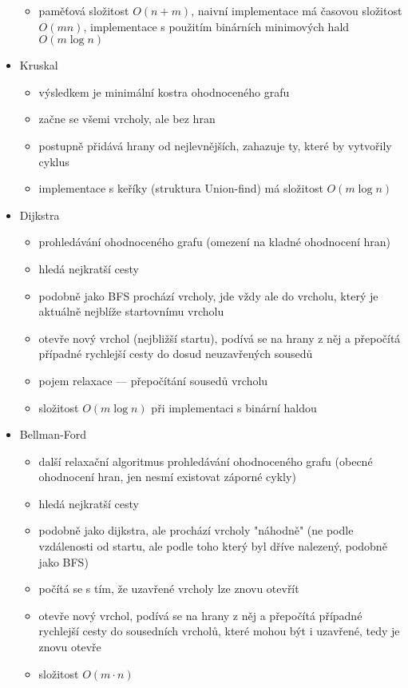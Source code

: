 \begin{itemize}
\begin{itemize}
		\item paměťová složitost $O(n + m)$, naivní implementace má časovou složitost $O(mn)$, implementace s použitím binárních minimových hald $O(m\log n)$
	\end{itemize}
	\item Kruskal
	\begin{itemize}
		\item výsledkem je minimální kostra ohodnoceného grafu
		\item začne se všemi vrcholy, ale bez hran
		\item postupně přidává hrany od nejlevnějších, zahazuje ty, které by vytvořily cyklus
		\item implementace s keříky (struktura Union-find) má složitost $O(m\log n)$
	\end{itemize}
	\item Dijkstra
	\begin{itemize}
		\item prohledávání ohodnoceného grafu (omezení na kladné ohodnocení hran)
		\item hledá nejkratší cesty
		\item podobně jako BFS prochází vrcholy, jde vždy ale do vrcholu, který je aktuálně nejblíže startovnímu vrcholu
		\item otevře nový vrchol (nejbližší startu), podívá se na hrany z něj a přepočítá případné rychlejší cesty do dosud neuzavřených sousedů
		\item pojem relaxace --- přepočítání sousedů vrcholu
		\item  složitost $O(m\log n)$ při implementaci s binární haldou
	\end{itemize}
	\item Bellman-Ford
	\begin{itemize}
		\item další relaxační algoritmus prohledávání ohodnoceného grafu (obecné ohodnocení hran, jen nesmí existovat záporné cykly)
		\item hledá nejkratší cesty
		\item podobně jako dijkstra, ale prochází vrcholy "náhodně" (ne podle vzdálenosti od startu, ale podle toho který byl dříve nalezený, podobně jako BFS)
		\item počítá se s tím, že uzavřené vrcholy lze znovu otevřít
		\item otevře nový vrchol, podívá se na hrany z něj a přepočítá případné rychlejší cesty do sousedních vrcholů, které mohou být i uzavřené, tedy je znovu otevře
		\item  složitost $O(m \cdot n)$
	\end{itemize}
\end{itemize}
